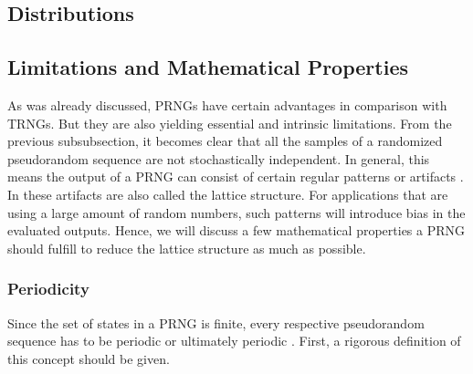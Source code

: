 \documentclass{stdlocal}
\begin{document}
  \subsection{Distributions}

  \subsection{Limitations and Mathematical Properties}
  As was already discussed, PRNGs have certain advantages in comparison with TRNGs.
  But they are also yielding essential and intrinsic limitations.
  From the previous subsubsection, it becomes clear that all the samples of a randomized pseudorandom sequence are not stochastically independent.
  In general, this means the output of a PRNG can consist of certain regular patterns or artifacts \autocite{lecuyer1994,oneill2014}.
  In \textcite{lecuyer1994} these artifacts are also called the lattice structure.
  For applications that are using a large amount of random numbers, such patterns will introduce bias in the evaluated outputs.
  Hence, we will discuss a few mathematical properties a PRNG should fulfill to reduce the lattice structure as much as possible.

  \subsubsection{Periodicity}
  Since the set of states in a PRNG is finite, every respective pseudorandom sequence has to be periodic or ultimately periodic \autocite{lecuyer1994,bauke2007}.
  First, a rigorous definition of this concept should be given.
\end{document}
